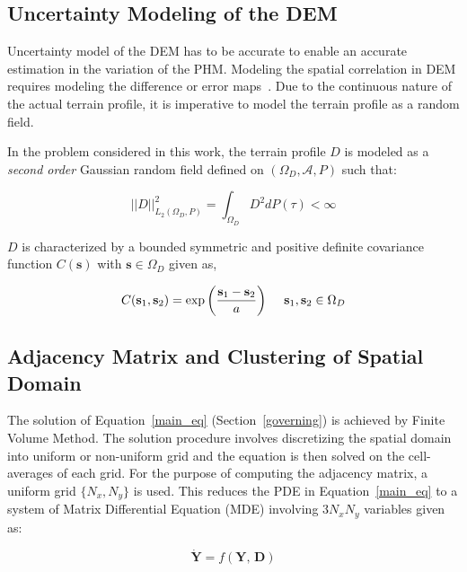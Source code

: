 \subsection{Uncertainty Modeling of the DEM}
\label{dem:uncertainty_model}
Uncertainty model of the DEM has to be accurate to enable an accurate estimation in the variation of the PHM. Modeling the spatial correlation in DEM requires modeling the difference or error maps~\cite{ehlschlaeger1994uncertainty, stefanescu2012digital}. Due to the continuous nature of the actual terrain profile, it is imperative to model the terrain profile as a random field.

In the problem considered in this work, the terrain profile $D$ is modeled as a \textit{second order} Gaussian random field defined on $(\Omega_D, \mathcal{A}, P)$ such that:

\begin{equation}
|| D ||^2_{L_2 (\Omega_D, P)} = \int_{\Omega_D} D^2 dP(\tau) < \infty
\end{equation}

$D$ is characterized by a bounded symmetric and positive definite covariance function $C(\textbf{s})$ with $\textbf{s} \in \Omega_D$ given as,

\begin{equation}
C(\textbf{s}_1, \textbf{s}_2) = \exp{\left( \frac{\textbf{s}_1 - \textbf{s}_2}{a} \right)} \hspace{5mm} \textbf{s}_1, \textbf{s}_2 \in \Omega_D
\end{equation}

\subsection{Adjacency  Matrix and Clustering of Spatial Domain}
\label{dem_adjacency}
The solution of Equation~\ref{main_eq} (Section~\ref{governing}) is achieved by Finite Volume Method. The solution procedure involves discretizing the spatial domain into uniform or non-uniform grid and the equation is then solved on the cell-averages of each grid. For the purpose of computing the adjacency matrix, a uniform grid $\lbrace N_x, N_y \rbrace$ is used. This reduces the PDE in Equation~\ref{main_eq} to a system of Matrix Differential Equation (MDE) involving $3N_x N_y$ variables given as:

\begin{equation}
\label{mde}
\dot{\textbf{Y}} = f(\textbf{Y, D})
\end{equation}

